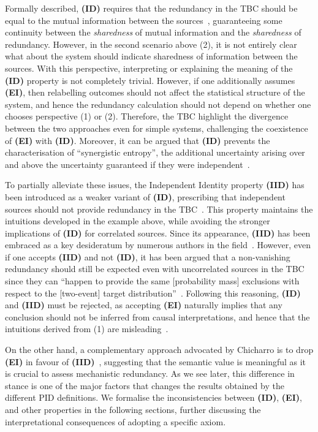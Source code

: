 \documentclass{article}
\newcommand{\ID}{\textbf{(ID)}\xspace} %
\newcommand{\IID}{\textbf{(IID)}\xspace} %
\newcommand{\EI}{\textbf{(EI)}\xspace} %
\begin{document}
Formally described, \ID requires that the redundancy in the TBC should be equal to the mutual information between the sources~\cite{harder2013bivariate}, guaranteeing some continuity between the \textit{sharedness} of mutual information and the \textit{sharedness} of redundancy. However, in the second scenario above (2), it is not entirely clear what about the system should indicate sharedness of information between the sources. With this perspective, interpreting or explaining the meaning of the \ID property is not completely trivial. However, if one additionally assumes \EI, then relabelling outcomes should not affect the statistical structure of the system, and hence the redundancy calculation should not depend on whether one chooses perspective (1) or (2). Therefore, the TBC highlight the divergence between the two approaches even for simple systems, challenging the coexistence of \EI with \ID. Moreover, it can be argued that \ID prevents the characterisation of ``synergistic entropy'', the additional uncertainty arising over and above the uncertainty guaranteed if they were independent~\cite{ince2017measuring}.

To partially alleviate these issues, the Independent Identity property \IID has been introduced as a weaker variant of \ID, prescribing that independent sources should not provide redundancy in the TBC~\cite{ince2017measuring}. This property maintains the intuitions developed in the example above, while avoiding the stronger implications of \ID for correlated sources. Since its appearance, \IID has been embraced as a key desideratum by numerous authors in the field~\cite{ince2017measuring, kolchinsky2022novel, lyu2024explicit}. However, even if one accepts \IID and not \ID, it has been argued that a non-vanishing redundancy should still be expected even with uncorrelated sources in the TBC since they can ``happen to provide the same [probability mass] exclusions with respect to the [two-event] target distribution''~\cite{finn2018pointwise}. Following this reasoning, \ID and \IID must be rejected, as accepting \EI naturally implies that any conclusion should not be inferred from causal interpretations, and hence that the intuitions derived from (1) are misleading~\cite{finn2018pointwise}.

On the other hand, a complementary approach advocated by Chicharro is to drop \EI in favour of \IID~\cite{chicharro2018identity}, suggesting that the semantic value is meaningful as it is crucial to assess mechanistic redundancy. 
As we see later, this difference in stance is one of the major factors that changes the results obtained by the different PID definitions.
We formalise the inconsistencies between \ID, \EI, and other properties in the following sections, further discussing the interpretational consequences of adopting a specific axiom.
\end{document}
